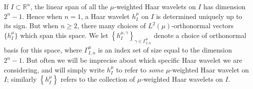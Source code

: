 \documentclass{amsart}%
\theoremstyle{plain}
\numberwithin{equation}{section}
\begin{document}
If $I \subset \mathbb{R}^n$, the linear span of all the $\mu
$-weighted Haar wavelets on $I$ has dimension $2^{n}-1$. Hence when $n=1$, a Haar
wavelet $h_{I}^{\mu}$ on $I$ is determined uniquely up to its sign. But when $n \geq 2$, there many choices of $L^{2}(\mu
)$-orthonormal vectors $\{h_{I}^{\mu}\}$ which span this space. We let $\left\{  h_{I}^{\mu,\gamma
}\right\}  _{\gamma\in\Gamma_{I,n}^{\mu}}$ denote a choice of orthonormal
basis for this space, where $\Gamma_{I,n}^{\mu}$ is an index set of size equal to the dimension $2^{n}-1$.
But often we will be imprecise about which specific Haar wavelet we are considering, and will simply write
$h_{I}^{\mu}$ to refer to \emph{some} $\mu$-weighted Haar wavelet on 
$I$; similarly $\left\{  h_{I}^{\mu}\right\}  $ refers to the
collection of $\mu$-weighted Haar wavelets on $I$.
\end{document}
